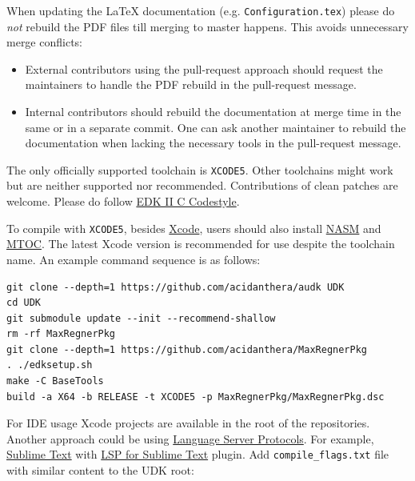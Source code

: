 \documentclass[]{article}
\providecommand{\tightlist}{%
  \setlength{\itemsep}{0pt}\setlength{\parskip}{0pt}}
\begin{document}
When updating the LaTeX documentation (e.g. \texttt{Configuration.tex}) please
do \textit{not} rebuild the PDF files till merging to master happens. This avoids
unnecessary merge conflicts:
\begin{itemize}
\tightlist
\item External contributors using the pull-request approach should request
  the maintainers to handle the PDF rebuild in the pull-request message.
\item Internal contributors should rebuild the documentation at merge time
  in the same or in a separate commit. One can ask another maintainer to
  rebuild the documentation when lacking the necessary tools
  in the pull-request message.
\end{itemize}

The only officially supported toolchain is \texttt{XCODE5}. Other toolchains
might work but are neither supported nor recommended. Contributions of clean
patches are welcome. Please do follow
\href{https://github.com/tianocore/tianocore.github.io/wiki/Code-Style-C}{EDK II C Codestyle}.

To compile with \texttt{XCODE5}, besides \href{https://developer.apple.com/xcode}{Xcode},
users should also install \href{https://www.nasm.us}{NASM} and
\href{https://github.com/acidanthera/ocbuild/tree/master/external}{MTOC}.
The latest Xcode version is recommended for use despite the toolchain name.
An example command sequence is as follows:

\begin{lstlisting}[caption=Compilation Commands, label=compile, style=ocbash]
git clone --depth=1 https://github.com/acidanthera/audk UDK
cd UDK
git submodule update --init --recommend-shallow
rm -rf MaxRegnerPkg
git clone --depth=1 https://github.com/acidanthera/MaxRegnerPkg
. ./edksetup.sh
make -C BaseTools
build -a X64 -b RELEASE -t XCODE5 -p MaxRegnerPkg/MaxRegnerPkg.dsc
\end{lstlisting}

For IDE usage Xcode projects are available in the root of the repositories. Another
approach could be using \href{https://microsoft.github.io/language-server-protocol}{Language Server Protocols}. For example, \href{https://www.sublimetext.com}{Sublime Text} with
\href{https://lsp.sublimetext.io}{LSP for Sublime Text} plugin.
Add \texttt{compile\_flags.txt} file with similar content to the UDK root:
\end{document}
